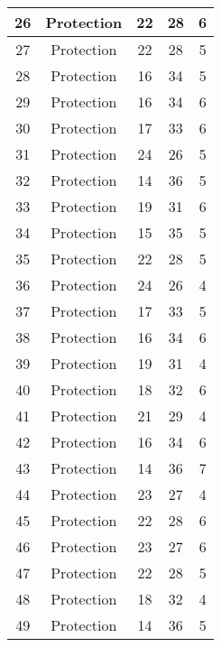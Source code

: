 \documentclass[results.tex]{subfiles}
\begin{document}
\begin{center}
\begin{tabular}{| c || c | c | c | c |}
    \hline
    26 & Protection & 22 & 28 & 6 \\ 
    \hline
    27 & Protection & 22 & 28 & 5 \\ 
    \hline
    28 & Protection & 16 & 34 & 5 \\ 
    \hline
    29 & Protection & 16 & 34 & 6 \\ 
    \hline
    30 & Protection & 17 & 33 & 6 \\ 
    \hline
    31 & Protection & 24 & 26 & 5 \\ 
    \hline
    32 & Protection & 14 & 36 & 5 \\ 
    \hline
    33 & Protection & 19 & 31 & 6 \\ 
    \hline
    34 & Protection & 15 & 35 & 5 \\ 
    \hline
    35 & Protection & 22 & 28 & 5 \\ 
    \hline
    36 & Protection & 24 & 26 & 4 \\ 
    \hline
    37 & Protection & 17 & 33 & 5 \\ 
    \hline
    38 & Protection & 16 & 34 & 6 \\ 
    \hline
    39 & Protection & 19 & 31 & 4 \\ 
    \hline
    40 & Protection & 18 & 32 & 6 \\ 
    \hline
    41 & Protection & 21 & 29 & 4 \\ 
    \hline
    42 & Protection & 16 & 34 & 6 \\ 
    \hline
    43 & Protection & 14 & 36 & 7 \\ 
    \hline
    44 & Protection & 23 & 27 & 4 \\ 
    \hline
    45 & Protection & 22 & 28 & 6 \\ 
    \hline
    46 & Protection & 23 & 27 & 6 \\ 
    \hline
    47 & Protection & 22 & 28 & 5 \\ 
    \hline
    48 & Protection & 18 & 32 & 4 \\ 
    \hline
    49 & Protection & 14 & 36 & 5 \\ 
    \hline   \end{tabular}
\end{center}
\end{document}

